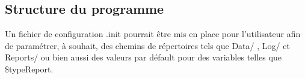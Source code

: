 \documentclass[a4paper,11pt]{article}
\begin{document}
	\subsection{Structure du programme}
		Un fichier de configuration .init pourrait être mis en place pour l'utilisateur afin de paramétrer, à souhait, des chemins de répertoires tels que Data/ , Log/ et Reports/  ou bien aussi des valeurs par défault pour des variables telles que \$typeReport.
		
	
\end{document}
